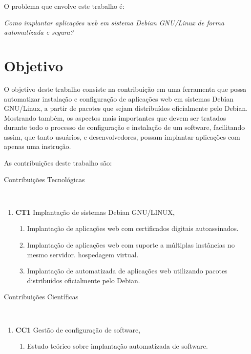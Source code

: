 O problema que envolve este trabalho é:

\begin{center}
  \textit{
  Como implantar aplicações web em sistema Debian GNU/Linux de forma automatizada
  e segura?
}
\end{center}

\section{Objetivo}

O objetivo deste trabalho consiste na contribuição em uma ferramenta
que possa automatizar instalação e configuração de aplicações web em sistemas
Debian GNU/Linux, a partir de pacotes que sejam distribuídos oficialmente pelo
Debian. Mostrando também, os aspectos mais importantes que devem ser tratados durante
todo o processo de configuração e instalação de um software, facilitando assim, que
tanto usuários, e desenvolvedores, possam implantar aplicações com apenas uma
instrução.

As contribuições deste trabalho são:

\begin{description}
  \item [Contribuições Tecnológicas]\
\end{description}
    \begin{enumerate}
      \item \textbf{CT1} Implantação de sistemas Debian GNU/LINUX,
        \begin{enumerate}
          \item Implantação de aplicações web com certificados digitais autoassinados.
          \item Implantação de aplicações web com suporte a múltiplas instâncias no mesmo servidor.
          hospedagem virtual.
          \item Implantação de automatizada de aplicações web utilizando pacotes
          distribuídos oficialmente pelo Debian.
        \end{enumerate}
    \end{enumerate}

\begin{description}
  \item [Contribuições Científicas]\
\end{description}
    \begin{enumerate}
      \item \textbf{CC1} Gestão de configuração de software,
        \begin{enumerate}
          \item Estudo teórico sobre implantação automatizada de software.
        \end{enumerate}
    \end{enumerate}


